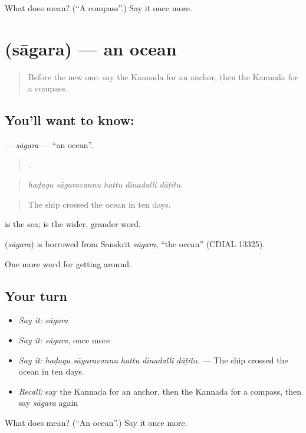\begin{tcolorbox}[breakable,colback=teal!4,colframe=teal!35!black,title={Before you move on}]
What does  mean? (\textquotedblleft{}A compass\textquotedblright{}.) Say it once more.
\end{tcolorbox}
\section[\texorpdfstring{\kn{ಸಾಗರ} (sāgara)}{ಸಾಗರ (sāgara)}]{ (sāgara) — an ocean}

\label{lesson:KA-C453-sagara}



\begin{quote}
Before the new one: say the Kannada for an anchor, then the Kannada for a compass.
\end{quote}

\subsection*{You'll want to know: }
\textbf{} — \emph{sāgara} — \textquotedblleft{}an ocean\textquotedblright{}.

\begin{quote}
    .
\end{quote}

\begin{quote}
\emph{haḍagu sāgaravannu hattu dinadalli dāṭitu.}
\end{quote}

\begin{quote}
The ship crossed the ocean in ten days.
\end{quote}

 is the sea;  is the wider, grander word.

\begin{cousinweb}
\textbf{} (\emph{sāgara}) is borrowed from Sanskrit \emph{sāgara}, \textquotedblleft{}the ocean\textquotedblright{} (CDIAL 13325).
\end{cousinweb}

\begin{grammarlens}[title={What you've built}]
One more word for getting around.
\end{grammarlens}

\subsection*{Your turn}
\begin{itemize}
\raggedright
  \item \emph{Say it:} \emph{sāgara}
  \item \emph{Say it:} \emph{sāgara}, once more
  \item \emph{Say it:} \emph{haḍagu sāgaravannu hattu dinadalli dāṭitu.} — The ship crossed the ocean in ten days.
  \item \emph{Recall:} say the Kannada for an anchor, then the Kannada for a compass, then say \emph{sāgara} again
\end{itemize}

\begin{tcolorbox}[breakable,colback=teal!4,colframe=teal!35!black,title={Before you move on}]
What does  mean? (\textquotedblleft{}An ocean\textquotedblright{}.) Say it once more.
\end{tcolorbox}
